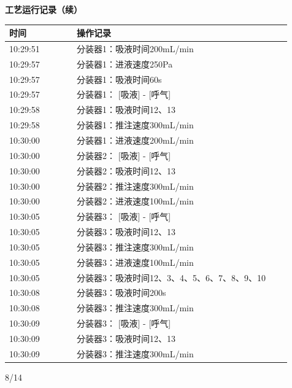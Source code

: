 \documentclass[UTF8,10pt,a4paper,fontset=fandol]{ctexart}
\newcommand{\handwritten}[1]{#1}
\begin{document}
\hfill
\begin{minipage}[t]{0.47\linewidth}
\scriptsize
\textbf{工艺运行记录（续）}

\begin{tabular}{|p{0.22\linewidth}|p{0.70\linewidth}|}
\hline
时间 & 操作记录 \\ \hline
10:29:51 & 分装器1：吸液时间200mL/min \\ \hline
10:29:57 & 分装器1：进液速度250Pa \\ \hline
10:29:57 & 分装器1：吸液时间60s \\ \hline
10:29:57 & 分装器1： [吸液] - [呼气] \\ \hline
10:29:58 & 分装器1：吸液时间12、13 \\ \hline
10:29:58 & 分装器1：推注速度300mL/min \\ \hline
10:30:00 & 分装器1：进液速度200mL/min \\ \hline
10:30:00 & 分装器2： [吸液] - [呼气] \\ \hline
10:30:00 & 分装器2：吸液时间12、13 \\ \hline
10:30:00 & 分装器2：推注速度300mL/min \\ \hline
10:30:00 & 分装器2：进液速度100mL/min \\ \hline
10:30:05 & 分装器3： [吸液] - [呼气] \\ \hline
10:30:05 & 分装器3：吸液时间12、13 \\ \hline
10:30:05 & 分装器3：推注速度300mL/min \\ \hline
10:30:05 & 分装器3：进液速度100mL/min \\ \hline
10:30:05 & 分装器3：吸液时间12、3、4、5、6、7、8、9、10 \\ \hline
10:30:08 & 分装器3：吸液时间200s \\ \hline
10:30:08 & 分装器3：推注速度300mL/min \\ \hline
10:30:09 & 分装器3： [吸液] - [呼气] \\ \hline
10:30:09 & 分装器3：吸液时间12、13 \\ \hline
10:30:09 & 分装器3：推注速度300mL/min \\ \hline
\end{tabular}

\vspace{4mm}
\handwritten{8/14}
\end{minipage}

\end{document}
